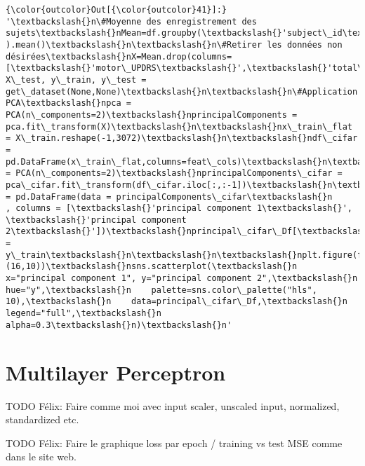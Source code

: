 \documentclass[11pt]{article}
\begin{document}
\begin{Verbatim}[commandchars=\\\{\}]
{\color{outcolor}Out[{\color{outcolor}41}]:} '\textbackslash{}n\#Moyenne des enregistrement des sujets\textbackslash{}nMean=df.groupby(\textbackslash{}'subject\_id\textbackslash{}',as\_index=False, ).mean()\textbackslash{}n\textbackslash{}n\#Retirer les données non désirées\textbackslash{}nX=Mean.drop(columns=[\textbackslash{}'motor\_UPDRS\textbackslash{}',\textbackslash{}'total\_UPDRS\textbackslash{}',\textbackslash{}'subject\_id\textbackslash{}'])\textbackslash{}n\textbackslash{}nX\_train, X\_test, y\_train, y\_test = get\_dataset(None,None)\textbackslash{}n\textbackslash{}n\#Application PCA\textbackslash{}npca = PCA(n\_components=2)\textbackslash{}nprincipalComponents = pca.fit\_transform(X)\textbackslash{}n\textbackslash{}nx\_train\_flat = X\_train.reshape(-1,3072)\textbackslash{}n\textbackslash{}ndf\_cifar = pd.DataFrame(x\_train\_flat,columns=feat\_cols)\textbackslash{}n\textbackslash{}npca\_cifar = PCA(n\_components=2)\textbackslash{}nprincipalComponents\_cifar = pca\_cifar.fit\_transform(df\_cifar.iloc[:,:-1])\textbackslash{}n\textbackslash{}nprincipal\_cifar\_Df = pd.DataFrame(data = principalComponents\_cifar\textbackslash{}n             , columns = [\textbackslash{}'principal component 1\textbackslash{}', \textbackslash{}'principal component 2\textbackslash{}'])\textbackslash{}nprincipal\_cifar\_Df[\textbackslash{}'y\textbackslash{}'] = y\_train\textbackslash{}n\textbackslash{}n\textbackslash{}nplt.figure(figsize=(16,10))\textbackslash{}nsns.scatterplot(\textbackslash{}n    x="principal component 1", y="principal component 2",\textbackslash{}n    hue="y",\textbackslash{}n    palette=sns.color\_palette("hls", 10),\textbackslash{}n    data=principal\_cifar\_Df,\textbackslash{}n    legend="full",\textbackslash{}n    alpha=0.3\textbackslash{}n)\textbackslash{}n'
\end{Verbatim}
            
    \section{Multilayer Perceptron}\label{multilayer-perceptron}

    TODO Félix: Faire comme moi avec input scaler, unscaled input,
normalized, standardized etc.

TODO Félix: Faire le graphique loss par epoch / training vs test MSE
comme dans le site web.
\end{document}
